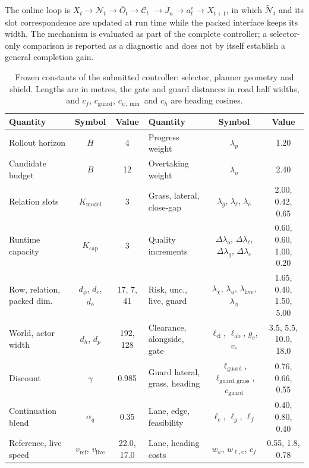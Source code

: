 \documentclass[journal]{IEEEtran}
\begin{document}
The online loop is
$X_t\rightarrow\mathcal N_t\rightarrow\bar O_t\rightarrow\mathcal C_t$
$\rightarrow J_n\rightarrow a_t^e\rightarrow X_{t+1}$, in which
$\widetilde{\mathcal N}_t$ and its slot correspondence are updated at run time
while the packed interface keeps its width. The mechanism is evaluated as part
of the complete controller; a selector-only comparison is reported as a
diagnostic and does not by itself establish a general completion gain.

\begin{table}[!t]
\centering
\caption{Frozen constants of the submitted controller:
selector, planner geometry and shield. Lengths are in metres, the gate and guard
distances in road half widths, and $c_f$, $c_{\mathrm{guard}}$,
$c_{\psi,\min}$ and $c_h$ are heading cosines.}
\label{tab:frozen_config}
\scriptsize
\setlength{\tabcolsep}{4pt}
\begin{tabular}{@{}lcc@{\hspace{16pt}}lcc@{}}
\toprule
Quantity & Symbol & Value & Quantity & Symbol & Value \\
\midrule
Rollout horizon & $H$ & 4 & Progress weight & $\lambda_p$ & 1.20 \\
Candidate budget & $B$ & 12 & Overtaking weight & $\lambda_o$ & 2.40 \\
Relation slots & $K_{\mathrm{model}}$ & 3 & Grass, lateral, close-gap & $\lambda_g$, $\lambda_\ell$, $\lambda_c$ & 2.00, 0.42, 0.65 \\
Runtime capacity & $K_{\mathrm{cap}}$ & 3 & Quality increments & $\Delta\lambda_o$, $\Delta\lambda_\ell$, $\Delta\lambda_g$, $\Delta\lambda_c$ & 0.60, 0.60, 1.00, 0.20 \\
Row, relation, packed dim. & $d_\phi$, $d_r$, $d_o$ & 17, 7, 41 & Risk, unc., live, guard & $\lambda_\chi$, $\lambda_u$, $\lambda_{\mathrm{live}}$, $\lambda_\phi$ & 1.65, 0.40, 1.50, 5.00 \\
World, actor width & $d_h$, $d_p$ & 192, 128 & Clearance, alongside, gate & $\ell_{\mathrm{cl}}$, $\ell_{\mathrm{ab}}$, $g_c$, $v_c$ & 3.5, 5.5, 10.0, 18.0 \\
Discount & $\gamma$ & 0.985 & Guard lateral, grass, heading & $\ell_{\mathrm{guard}}$, $\ell_{\mathrm{guard,grass}}$, $c_{\mathrm{guard}}$ & 0.76, 0.66, 0.55 \\
Continuation blend & $\alpha_q$ & 0.35 & Lane, edge, feasibility & $\ell_e$, $\ell_g$, $\ell_f$ & 0.40, 0.80, 0.40 \\
Reference, live speed & $v_{\mathrm{ref}}$, $v_{\mathrm{live}}$ & 22.0, 17.0 & Lane, heading costs & $w_\psi$, $w_{\ell,e}$, $c_f$ & 0.55, 1.8, 0.78 \\

\end{tabular}
\end{table}
\end{document}
